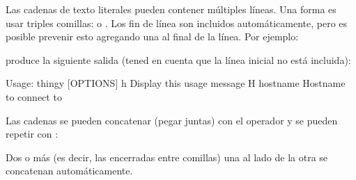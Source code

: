 \documentclass[a5paper,10pt,spanish]{sphinxmanual}
\begin{document}
\sphinxAtStartPar
Las cadenas de texto literales pueden contener múltiples líneas. Una forma es usar triples comillas:  o . Los fin de línea son incluidos automáticamente, pero es posible prevenir esto agregando una \sphinxcode{\sphinxupquote{\textbackslash{}}} al final de la línea. Por ejemplo:

\begin{sphinxVerbatim}[commandchars=\\\{\}]
\end{sphinxVerbatim}

\sphinxAtStartPar
produce la siguiente salida (tened en cuenta que la línea inicial no está incluida):

\begin{sphinxVerbatim}[commandchars=\\\{\}]
Usage: thingy [OPTIONS]
     \PYGZhy{}h                        Display this usage message
     \PYGZhy{}H hostname               Hostname to connect to
\end{sphinxVerbatim}

\sphinxAtStartPar
Las cadenas se pueden concatenar (pegar juntas) con el operador \sphinxcode{\sphinxupquote{+}} y se pueden repetir con \sphinxcode{\sphinxupquote{*}}:

\begin{sphinxVerbatim}[commandchars=\\\{\}]
    
\end{sphinxVerbatim}

\sphinxAtStartPar
Dos o más  (es decir, las encerradas entre comillas) una al lado de la otra se concatenan automáticamente.

\begin{sphinxVerbatim}[commandchars=\\\{\}]
 
\end{sphinxVerbatim}
\end{document}
